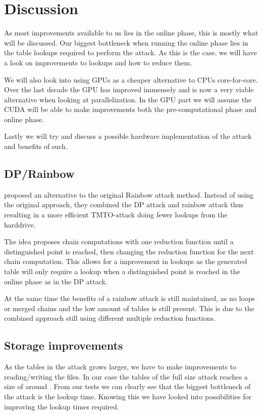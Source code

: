 \chapter{Discussion}
\label{ch:disc}

As most improvements available to us lies in the online phase, this
is mostly what will be discussed. Our biggest bottleneck when running
the online phase lies in the table lookups required to perform the
attack. As this is the case, we will have a look on improvements to
lookups and how to reduce them.

We will also look into using GPUs as a cheaper alternative to CPUs
core-for-core. Over the last decade the GPU has improved immensely and
is now a very viable alternative when looking at parallelization. In
the GPU part we will assume the CUDA will be able to make improvements
both the pre-computational phase and online phase.

Lastly we will try and discuss a possible hardware implementation of the attack
and benefits of such.

\section{DP/Rainbow}

\cite{nohl} proposed an alternative to the original Rainbow attack
method. Instead of using the original approach, they combined the DP
attack and rainbow attack thus resulting in a more efficient
TMTO-attack doing fewer lookups from the harddrive.

The idea proposes chain computations with one reduction function
until a distinguished point is reached, then changing the reduction
function for the next chain computation. This allows for a improvement
in lookups as the generated table will only require a lookup when a
distinguished point is reached in the online phase as in the DP attack. 

At the same time the benefits of a rainbow attack is still maintained,
as no loops or merged chains and the low amount of tables is still
present. This is due to the combined approach still using different
multiple reduction functions.

\section{Storage improvements}

As the tables in the attack grows larger, we have to make improvements
to reading/writing the files. In our case the tables of the full size
attack reaches a size of around . From our tests we can
clearly see that the biggest bottleneck of the attack is the lookup
time. Knowing this we have looked into possibilities for improving the
lookup times required.

